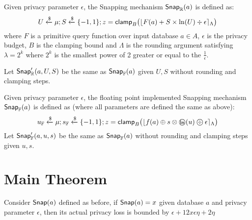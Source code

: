 \documentclass[a4paper,11pt]{article}
\begin{document}
\begin{defn}
Given privacy parameter $\epsilon$, the Snapping mechanism $\mathsf{Snap}_{\mathbb{R}}(a)$ is defined as:
\[
	U \xleftarrow{\$} \mu; S \xleftarrow{\$} \{-1, 1\};
	z = \mathsf{clamp}_B \big(
	\lfloor F(a) + S \times \ln (U) \div \epsilon \rceil_{\Lambda}
	\big)
\]
where $F$ is a primitive query function over input database $a \in A$, $\epsilon$ is the privacy budget, $B$ is the clamping bound and $\Lambda$ is the rounding argument satisfying $\lambda = 2^k$ where $2^k$ is the smallest power of 2 greater or equal to the $\frac{1}{\epsilon}$.
%

%
Let $\mathsf{Snap}_{\mathbb{R}}'(a, U, S)$ be the same as $\mathsf{Snap}_{\mathbb{F}}(a)$ given $U, S$ without rounding and clamping steps.
\end{defn}


\begin{defn}
Given privacy parameter $\epsilon$, the floating point implemented
Snapping mechanism $\mathsf{Snap}_{\mathbb{F}}(a)$ is defined as (where all parameters are defined the same as above):
\[
	u_{\mathbb{F}} \xleftarrow{\$} \edistr;
	s_{\mathbb{F}} \samplel \{-1, 1\};
	z = \clamp_B \big(
	\round{f(a) \oplus s \otimes \oln (u) \odiv \epsilon}_{\Lambda}
	\big)
\]
Let $\mathsf{Snap}_{\mathbb{F}}'(a, u, s)$ be the same as $\mathsf{Snap}_{\mathbb{F}}(a)$ without rounding and clamping steps given $u, s$.
\end{defn}



\newpage
\section{Main Theorem}

\begin{thm}
Consider $\mathsf{Snap}(a)$ defined as before, if $\mathsf{Snap}(a) = x$ given database $a$ and privacy parameter $\epsilon$, then its actual privacy loss is bounded by $\epsilon + 12 x \epsilon \eta + 2\eta$
\end{thm}
\end{document}
